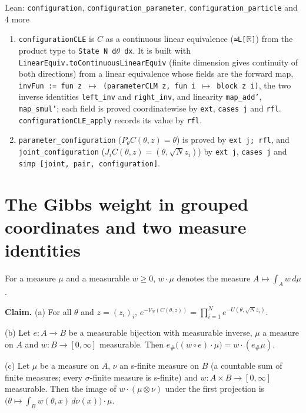 \documentclass[11pt,a4paper]{article}
\begin{document}
\begin{leanbox}{Lean: \texttt{configuration}, \texttt{configuration\_\allowbreak{}parameter}, \texttt{configuration\_\allowbreak{}particle} and 4 more}
\begin{enumerate}
\item \texttt{configuration\allowbreak{}CLE} is \(C\) as a continuous linear equivalence (\texttt{≃L[\ensuremath{\mathbb R}]}) from the product type to \texttt{State N d\ensuremath{\theta} dx}. It is built with \texttt{Linear\allowbreak{}Equiv.\allowbreak{}to\allowbreak{}Continuous\allowbreak{}Linear\allowbreak{}Equiv} (finite dimension gives continuity of both directions) from a linear equivalence whose fields are the forward map, \texttt{inv\allowbreak{}Fun := fun z \ensuremath{\mapsto} (parameter\allowbreak{}CLM z, fun i \ensuremath{\mapsto} block z i)}, the two inverse identities \texttt{left\_\allowbreak{}inv} and \texttt{right\_\allowbreak{}inv}, and linearity \texttt{map\_\allowbreak{}add'}, \texttt{map\_\allowbreak{}smul'}; each field is proved coordinatewise by \texttt{ext}, \texttt{cases j} and \texttt{rfl}. \texttt{configuration\allowbreak{}CLE\_\allowbreak{}apply} records its value by \texttt{rfl}.

\item \texttt{parameter\_\allowbreak{}configuration} (\(P_\theta C(\theta,z)=\theta\)) is proved by \texttt{ext j; rfl}, and \texttt{joint\_\allowbreak{}configuration} (\(J_iC(\theta,z)=(\theta,\sqrt Nz_i)\)) by \texttt{ext j}, \texttt{cases j} and \texttt{simp [joint, pair, configuration]}.

\end{enumerate}
\end{leanbox}

\section{\texorpdfstring{The Gibbs weight in grouped coordinates and two measure identities}{The Gibbs weight in grouped coordinates and two measure identities}}


For a measure \(\mu\) and a measurable \(w\ge0\), \(w\cdot\mu\) denotes the measure \(A\mapsto\int_Aw\,d\mu\).




\textbf{Claim.} (a) For all \(\theta\) and \(z=(z_i)_i\), \(e^{-V_N(C(\theta,z))}=\prod_{i=1}^Ne^{-U(\theta,\sqrt Nz_i)}\).




(b) Let \(e:A\to B\) be a measurable bijection with measurable inverse, \(\mu\) a measure on \(A\) and \(w:B\to[0,\infty]\) measurable. Then \(e_\#\bigl((w\circ e)\cdot\mu\bigr)=w\cdot(e_\#\mu)\).




(c) Let \(\mu\) be a measure on \(A\), \(\nu\) an s-finite measure on \(B\) (a countable sum of finite measures; every \(\sigma\)-finite measure is s-finite) and \(w:A\times B\to[0,\infty]\) measurable. Then the image of \(w\cdot(\mu\otimes\nu)\) under the first projection is \(\bigl(\theta\mapsto\int_Bw(\theta,x)\,d\nu(x)\bigr)\cdot\mu\).
\end{document}
